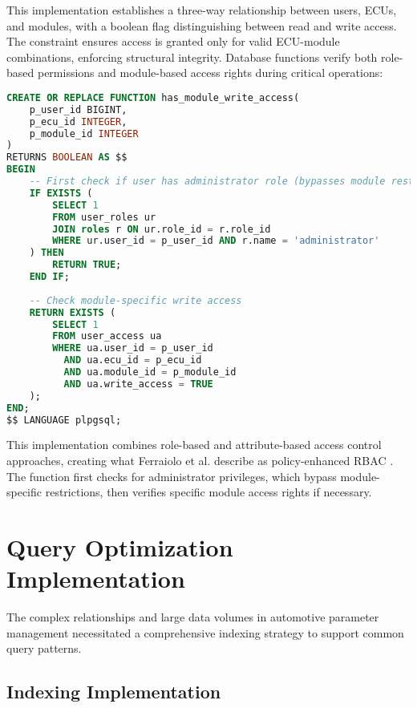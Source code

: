 This implementation establishes a three-way relationship between users, ECUs, and modules, with a boolean flag distinguishing between read and write access. The constraint ensures access is granted only for valid ECU-module combinations, enforcing structural integrity. Database functions verify both role-based permissions and module-based access rights during critical operations:

\begin{lstlisting}[language=SQL, caption={Module Access Check Implementation}, label={lst:module-access-check}]
CREATE OR REPLACE FUNCTION has_module_write_access(
    p_user_id BIGINT,
    p_ecu_id INTEGER,
    p_module_id INTEGER
)
RETURNS BOOLEAN AS $$
BEGIN
    -- First check if user has administrator role (bypasses module restrictions)
    IF EXISTS (
        SELECT 1
        FROM user_roles ur
        JOIN roles r ON ur.role_id = r.role_id
        WHERE ur.user_id = p_user_id AND r.name = 'administrator'
    ) THEN
        RETURN TRUE;
    END IF;
    
    -- Check module-specific write access
    RETURN EXISTS (
        SELECT 1
        FROM user_access ua
        WHERE ua.user_id = p_user_id
          AND ua.ecu_id = p_ecu_id
          AND ua.module_id = p_module_id
          AND ua.write_access = TRUE
    );
END;
$$ LANGUAGE plpgsql;
\end{lstlisting}

This implementation combines role-based and attribute-based access control approaches, creating what Ferraiolo et al. describe as policy-enhanced \ac{RBAC} \cite{ferraiolo2011policy}. The function first checks for administrator privileges, which bypass module-specific restrictions, then verifies specific module access rights if necessary.

\section{Query Optimization Implementation}
\label{sec:query-optimization-implementation}

The complex relationships and large data volumes in automotive parameter management necessitated a comprehensive indexing strategy to support common query patterns.

\subsection{Indexing Implementation}
\label{subsec:indexing-implementation}

